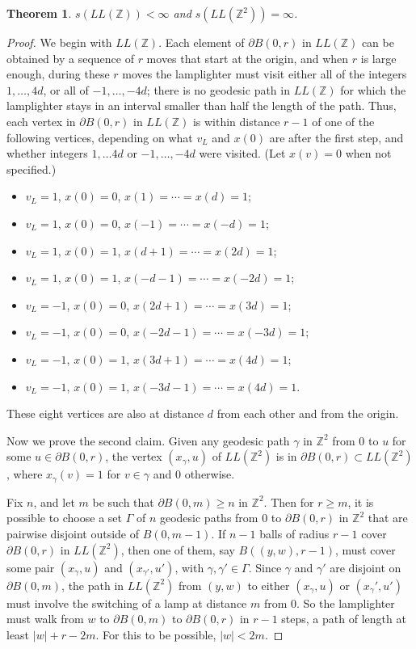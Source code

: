 \documentclass[11pt]{article}
\newtheorem{thm}{Theorem}
\newcommand{\Z}{\mathbb{Z}}
\begin{document}
\begin{thm} $s(LL(\Z)) < \infty$ and $s(LL(\Z^2)) = \infty$. \end{thm}
\label{lamplighter}
\begin{proof}
We begin with $LL(\Z)$. Each element of $\partial B(0,r)$ in $LL(\Z)$ can be obtained by a sequence of $r$ moves that start at the origin, and when $r$ is large enough, during these $r$ moves the lamplighter must visit either all of the integers $1, \ldots , 4d$, or all of $-1, \ldots, -4d$; there is no geodesic path in $LL(\Z)$ for which the lamplighter stays in an interval smaller than half the length of the path. Thus, each vertex in $\partial B(0,r)$ in $LL(\Z)$ is within distance $r-1$ of one of the following vertices, depending on what $v_L$ and $x(0)$ are after the first step, and whether integers $1, \ldots 4d$ or $-1, \ldots , -4d$ were visited. (Let $x(v) = 0$ when not specified.)
\begin{itemize}
\item $v_L = 1$, $x(0) = 0$, $x(1) = \cdots = x(d) = 1$;
\item $v_L = 1$, $x(0) = 0$, $x(-1) = \cdots = x(-d) = 1$;
\item $v_L = 1$, $x(0) = 1$, $x(d+1) = \cdots = x(2d) = 1$;
\item $v_L = 1$, $x(0) = 1$, $x(-d-1) = \cdots = x(-2d) = 1$;
\item $v_L = -1$, $x(0) = 0$, $x(2d+1) = \cdots = x(3d) = 1$;
\item $v_L = -1$, $x(0) = 0$, $x(-2d-1) = \cdots = x(-3d) = 1$;
\item $v_L = -1$, $x(0) = 1$, $x(3d+1) = \cdots = x(4d) = 1$;
\item $v_L = -1$, $x(0) = 1$, $x(-3d-1) = \cdots = x(4d) = 1$.
\end{itemize}
These eight vertices are also at distance $d$ from each other and from the origin. 

Now we prove the second claim. Given any geodesic path $\gamma$ in $\Z^2$ from $0$ to $u$ for some $u \in \partial B(0,r)$, the vertex $(x_\gamma,u)$ of $LL(\Z^2)$ is in $\partial B(0,r) \subset LL(\Z^2)$, where $x_\gamma(v) = 1$ for $v \in \gamma$ and 0 otherwise.

Fix $n$, and let $m$ be such that $\partial B(0,m)\geq n$ in $\Z^2$. Then for $r \geq m$, it is possible to choose a set $\Gamma$ of $n$ geodesic paths from $0$ to $\partial B(0,r)$ in $\Z^2$ that are pairwise disjoint outside of $B(0,m-1)$.  If $n-1$ balls of radius $r-1$ cover $\partial B(0,r)$ in $LL(\Z^2)$, then one of them, say $B((y,w),r-1)$, must cover some pair $(x_\gamma , u)$ and $(x_{\gamma'}, u')$, with $\gamma, \gamma' \in \Gamma$. Since $\gamma$ and $\gamma'$ are disjoint on $\partial B(0,m)$, the path in $LL(\Z^2)$ from $(y,w)$ to either $(x_\gamma, u)$ or $(x_\gamma', u')$ must involve the switching of a lamp at distance $m$ from 0. So the lamplighter must walk from $w$ to $\partial B(0,m)$ to $\partial B(0,r)$ in $r-1$ steps, a path of length at least $|w|+r - 2m$. For this to be possible, $|w| < 2m$. 


\end{proof}
\end{document}
